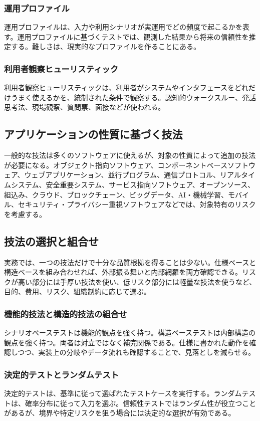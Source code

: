 \documentclass[uplatex,dvipdfmx,a4paper,11pt,nomag]{jsarticle}
\begin{document}
\subsubsection{運用プロファイル}
運用プロファイルは、入力や利用シナリオが実運用でどの頻度で起こるかを表す。運用プロファイルに基づくテストでは、観測した結果から将来の信頼性を推定する。難しさは、現実的なプロファイルを作ることにある。

\subsubsection{利用者観察ヒューリスティック}
利用者観察ヒューリスティックは、利用者がシステムやインタフェースをどれだけうまく使えるかを、統制された条件で観察する。認知的ウォークスルー、発話思考法、現場観察、質問票、面接などが使われる。

\subsection{アプリケーションの性質に基づく技法}
一般的な技法は多くのソフトウェアに使えるが、対象の性質によって追加の技法が必要になる。オブジェクト指向ソフトウェア、コンポーネントベースソフトウェア、ウェブアプリケーション、並行プログラム、通信プロトコル、リアルタイムシステム、安全重要システム、サービス指向ソフトウェア、オープンソース、組込み、クラウド、ブロックチェーン、ビッグデータ、AI・機械学習、モバイル、セキュリティ・プライバシー重視ソフトウェアなどでは、対象特有のリスクを考慮する。

\subsection{技法の選択と組合せ}
実務では、一つの技法だけで十分な品質根拠を得ることは少ない。仕様ベースと構造ベースを組み合わせれば、外部振る舞いと内部網羅を両方確認できる。リスクが高い部分には手厚い技法を使い、低リスク部分には軽量な技法を使うなど、目的、費用、リスク、組織制約に応じて選ぶ。

\subsubsection{機能的技法と構造的技法の組合せ}
シナリオベーステストは機能的観点を強く持つ。構造ベーステストは内部構造の観点を強く持つ。両者は対立ではなく補完関係である。仕様に書かれた動作を確認しつつ、実装上の分岐やデータ流れも確認することで、見落としを減らせる。

\subsubsection{決定的テストとランダムテスト}
決定的テストは、基準に従って選ばれたテストケースを実行する。ランダムテストは、確率分布に従って入力を選ぶ。信頼性テストではランダム性が役立つことがあるが、境界や特定リスクを狙う場合には決定的な選択が有効である。
\end{document}

